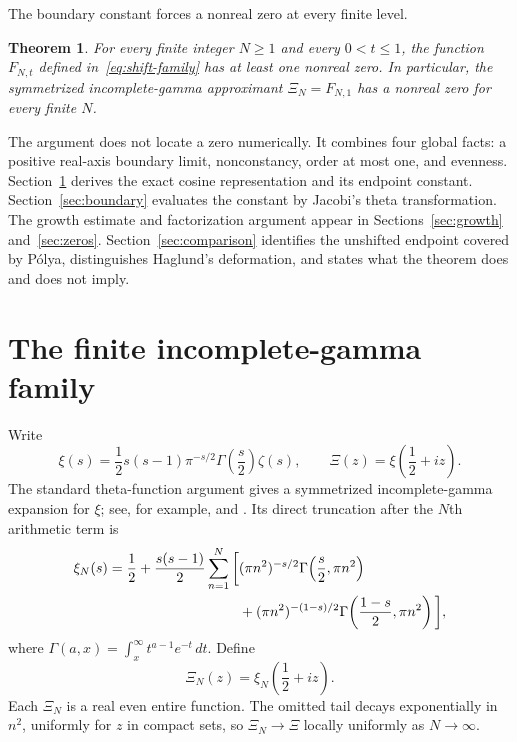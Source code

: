 \documentclass[11pt,a4paper]{amsart}
\newtheorem{theorem}{Theorem}[section]
\theoremstyle{remark}
\newcommand{\XiN}{\Xi_N}
\newcommand{\FNt}{F_{N,t}}
\begin{document}
The boundary constant forces a nonreal zero at every finite level.

\begin{theorem}\label{thm:main}
For every finite integer $N\geq1$ and every $0<t\leq1$, the function
$\FNt$ defined in~\eqref{eq:shift-family} has at least one nonreal zero.  In
particular, the symmetrized incomplete-gamma approximant
$\XiN=F_{N,1}$ has a nonreal zero for every finite $N$.
\end{theorem}

The argument does not locate a zero numerically.  It combines four global
facts: a positive real-axis boundary limit, nonconstancy, order at most one,
and evenness.  Section~\ref{sec:representation} derives the exact cosine
representation and its endpoint constant.  Section~\ref{sec:boundary}
evaluates the constant by Jacobi's theta transformation.  The growth estimate
and factorization argument appear in Sections~\ref{sec:growth}
and~\ref{sec:zeros}.  Section~\ref{sec:comparison} identifies the unshifted
endpoint covered by P\'olya, distinguishes Haglund's deformation, and states
what the theorem does and does not imply.

\section{The finite incomplete-gamma family}\label{sec:representation}

Write
\[
 \xi(s)=\frac12s(s-1)\pi^{-s/2}\Gamma\!\left(\frac{s}{2}\right)\zeta(s),
 \qquad
 \Xi(z)=\xi\!\left(\frac12+iz\right).
\]
The standard theta-function argument gives a symmetrized incomplete-gamma
expansion for $\xi$; see, for example, \cite[Ch.~1]{Edwards2001} and
\cite{Haglund2011}.  Its direct truncation after the $N$th arithmetic term is
\begin{align}
 \xi_N(s)=\frac12+\frac{s(s-1)}2\sum_{n=1}^N
 \bigg[& (\pi n^2)^{-s/2}
       \Gamma\!\left(\frac{s}{2},\pi n^2\right) \notag\\
 &+(\pi n^2)^{-(1-s)/2}
       \Gamma\!\left(\frac{1-s}{2},\pi n^2\right)\bigg],
 \label{eq:def-xin-s}
\end{align}
where $\Gamma(a,x)=\int_x^\infty t^{a-1}e^{-t}\,dt$.  Define
\begin{equation}\label{eq:def-xin}
 \XiN(z)=\xi_N\!\left(\frac12+iz\right).
\end{equation}
Each $\XiN$ is a real even entire function.  The omitted tail decays
exponentially in $n^2$, uniformly for $z$ in compact sets, so $\XiN\to\Xi$
locally uniformly as $N\to\infty$.
\end{document}
